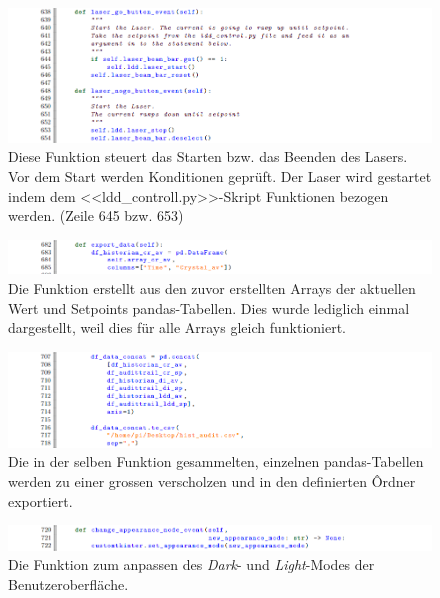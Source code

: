 \begin{appendix}
\begin{landscape}
\begin{figure}[H]
    \centering
    \includegraphics[scale=0.8]{98_images/src/fhnw_pro6m_quellcode_18.png}
    \caption*{Diese Funktion steuert das Starten bzw. das Beenden des Lasers. Vor dem Start werden Konditionen geprüft. Der Laser wird gestartet indem dem <<ldd\_controll.py>>-Skript Funktionen bezogen werden. (Zeile 645 bzw. 653)}
    \label{fig:fhnw_pro6m_quellcode_18}
\end{figure}

\begin{figure}[H]
    \centering
    \includegraphics[scale=0.8]{98_images/src/fhnw_pro6m_quellcode_19.png}
    \caption*{Die Funktion erstellt aus den zuvor erstellten Arrays der aktuellen Wert und Setpoints pandas-Tabellen. Dies wurde lediglich einmal dargestellt, weil dies für alle Arrays gleich funktioniert.}
    \label{fig:fhnw_pro6m_quellcode_19}
\end{figure}

\begin{figure}[H]
    \centering
    \includegraphics[scale=0.8]{98_images/src/fhnw_pro6m_quellcode_20.png}
    \caption*{Die in der selben Funktion gesammelten, einzelnen pandas-Tabellen werden zu einer grossen verscholzen und in den definierten Ôrdner exportiert.}
    \label{fig:fhnw_pro6m_quellcode_20}
\end{figure}

\begin{figure}[H]
    \centering
    \includegraphics[scale=0.8]{98_images/src/fhnw_pro6m_quellcode_21.png}
    \caption*{Die Funktion zum anpassen des \textit{Dark}- und \textit{Light}-Modes der Benutzeroberfläche.}
    \label{fig:fhnw_pro6m_quellcode_21}
\end{figure}


\end{landscape}
\end{appendix}
